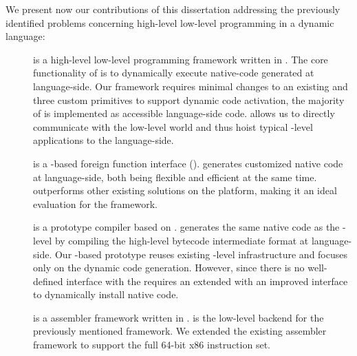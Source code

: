 We present now our contributions of this dissertation addressing the previously identified problems concerning high-level low-level programming in a dynamic language:

\begin{description}
	\item[\B] is a high-level low-level programming framework written in .
	The core functionality of \B is to dynamically execute native-code generated at language-side.
	Our framework requires minimal changes to an existing \VM and three custom primitives to support dynamic code activation, the majority of \B is implemented as accessible language-side code.
	\B allows us to directly communicate with the low-level world and thus hoist typical \VM-level applications to the language-side.
		
	\item[\NB] is a \B-based foreign function interface (\FFI).
	\NB generates customized native code at language-side, both being flexible and efficient at the same time.
	\NB outperforms other existing \FFI solutions on the \PH platform, making it an ideal evaluation for the \B framework.
	
	\item[\NBJ] is a prototype \JIT compiler based on \B.
	\NBJ generates the same native code as the \VM-level \JIT by compiling the high-level bytecode intermediate format at language-side.
	Our \B-based \JIT prototype reuses existing \VM-level infrastructure and focuses only on the dynamic code generation.
	However, since there is no well-defined interface with the \VM \NBJ requires an extended \VM with an improved \JIT interface to dynamically install native code.
	
	\item[\AsmJIT] is a assembler framework written in \PH.
	\AsmJIT is the low-level backend for the previously mentioned \B framework.
	We extended the existing assembler framework to support the full 64-bit x86 instruction set.

	
\end{description}


